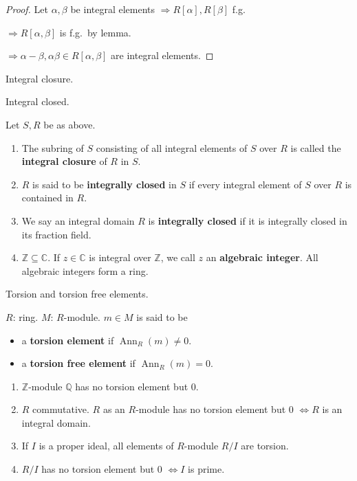 \documentclass[11pt, a4paper]{report}
\begin{document}
\begin{proof}
Let $\alpha, \beta$ be integral elements $\Rightarrow R[\alpha], R[\beta]$ f.g.

$\Rightarrow R[\alpha, \beta]$ is f.g.\ by lemma.

$\Rightarrow \alpha - \beta, \alpha \beta \in R[\alpha, \beta]$ are integral elements.
\end{proof}

\begin{definition}
Integral closure.
\end{definition}

\begin{definition}
Integral closed.

Let $S, R$ be as above.
\begin{enumerate}
\item The subring of $S$ consisting of all integral elements of $S$ over $R$ is called the \textbf{integral closure} of $R$ in $S$.
\item $R$ is said to be \textbf{integrally closed} in $S$ if every integral element of $S$ over $R$ is contained in $R$.
\item We say an integral domain $R$ is \textbf{integrally closed} if it is integrally closed in its fraction field.
\item $\mathbb{Z} \subseteq \mathbb{C}$. If $z \in \mathbb{C}$ is integral over $\mathbb{Z}$, we call $z$ an \textbf{algebraic integer}. All algebraic integers form a ring.
\end{enumerate}
\end{definition}

\begin{definition}
Torsion and torsion free elements.

$R$: ring. $M$: $R$-module. $m \in M$ is said to be
\begin{itemize}
\item a \textbf{torsion element} if $\operatorname{Ann}_{R}(m) \neq 0$.
\item a \textbf{torsion free element} if $\operatorname{Ann}_{R}(m) = 0$.
\end{itemize}
\end{definition}

\begin{example}
\begin{enumerate}
\item $\mathbb{Z}$-module $\mathbb{Q}$ has no torsion element but $0$.
\item $R$ commutative. $R$ as an $R$-module has no torsion element but $0$ $\Leftrightarrow R$ is an integral domain.
\item If $I$ is a proper ideal, all elements of $R$-module $R/I$ are torsion.
\item $R/I$ has no torsion element but $0$ $\Leftrightarrow I$ is prime.
\end{enumerate}
\end{example}
\end{document}
